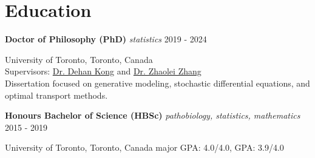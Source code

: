 \newcommand{\degree}[3]{
    \noindent\textbf{#1}  \emph{#2} \hfill #3 \break
}

\section{Education}
\degree{Doctor of Philosophy (PhD)}{statistics}{2019 - 2024}
University of Toronto, Toronto, Canada \\
Supervisors: \href{https://www.statistics.utoronto.ca/people/directories/all-faculty/dehan-kong}{Dr. Dehan Kong} and \href{http://sites.utoronto.ca/zhanglab/}{Dr. Zhaolei Zhang}\\
Dissertation focused on generative modeling, stochastic differential equations, and optimal transport methods.

\degree{Honours Bachelor of Science (HBSc)}{pathobiology, statistics, mathematics}{2015 - 2019}
University of Toronto, Toronto, Canada \hfill major GPA: 4.0/4.0, GPA: 3.9/4.0

\vspace{0.2em}